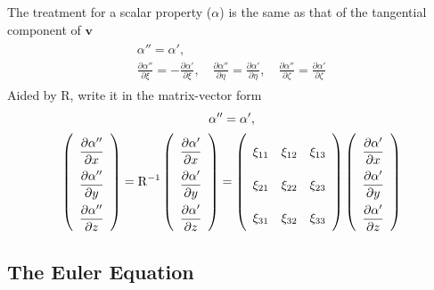 \documentclass[a4paper,12pt,dvips]{article}
\begin{document}
The treatment for a scalar property ($\alpha$) is the same as that of the
tangential component of $\mathbf{v}$
\begin{align*}
\begin{gathered}
  \alpha'' = \alpha', \\
  \frac{\partial \alpha''}{\partial\xi} =
  -\frac{\partial \alpha'}{\partial\xi}, \quad
  \frac{\partial \alpha''}{\partial\eta} =
  \frac{\partial \alpha'}{\partial\eta}, \quad
  \frac{\partial \alpha''}{\partial\zeta} =
  \frac{\partial \alpha'}{\partial\zeta}
\end{gathered}
\end{align*}
Aided by $\mathrm{R}$, write it in the matrix-vector form
\begin{align}
\begin{gathered}
  \alpha'' = \alpha', \\
  \renewcommand{\arraystretch}{2.2}
  \left(\begin{array}{c}
    \dfrac{\partial\alpha''}{\partial x} \\
    \dfrac{\partial\alpha''}{\partial y} \\
    \dfrac{\partial\alpha''}{\partial z} \\
  \end{array}\right)
  = \mathrm{R}^{-1}
  \left(\begin{array}{c}
    \dfrac{\partial\alpha'}{\partial x} \\
    \dfrac{\partial\alpha'}{\partial y} \\
    \dfrac{\partial\alpha'}{\partial z} \\
  \end{array}\right)
  = \left(\begin{array}{ccc}
    \xi_{11} & \xi_{12} & \xi_{13} \\
    \xi_{21} & \xi_{22} & \xi_{23} \\
    \xi_{31} & \xi_{32} & \xi_{33}
  \end{array}\right)
  \left(\begin{array}{c}
    \dfrac{\partial\alpha'}{\partial x} \\
    \dfrac{\partial\alpha'}{\partial y} \\
    \dfrac{\partial\alpha'}{\partial z} \\
  \end{array}\right)
\end{gathered}
\label{e:treat:sca}
\end{align}

\subsection{The Euler Equation}
\end{document}
